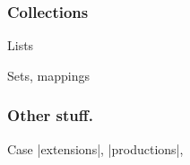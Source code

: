 

\subsubsection{Collections}
\label{sec:collections}

Lists

Sets, mappings


\subsubsection{Other stuff.}

Case |extensions|, |productions|,




